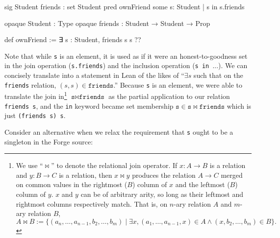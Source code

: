 \vspace{0.5em}
\noindent\begin{minipage}{0.5\textwidth}
\begin{forge*}
sig Student {
  friends : set Student
}
pred ownFriend {
  some s: Student |
    s in s.friends
}
\end{forge*}
\end{minipage}%
\begin{minipage}{0.5\textwidth}
\begin{lean*}
opaque Student : Type
opaque friends : Student → Student → Prop

def ownFriend := 
  ∃ s : Student, 
    friends s s
?\phantom{}?
\end{lean*}
\end{minipage}
\vspace{0.5em}\newline
Note that while \texttt{s} is an element, it is used as if it were an honest-to-goodness set in the join operation (\texttt{s.friends}) and the inclusion operation (\texttt{s in }...). We can concisely translate into a statement in Lean of the likes of ``$\exists s$ such that on the \texttt{friends} relation, $(s,s)\in \texttt{friends}$.'' Because \texttt{s} is an element, we were able to translate the join in\footnote{We use ``$\bowtie$'' to denote the relational join operator. If $x: A \to B$ is a relation and $y: B \to C$ is a relation, then $x\bowtie y$ produces the relation $A\to C$ merged on common values in the rightmost ($B$) column of $x$ and the leftmost ($B$) column of $y$. $x$ and $y$ can be of arbitrary arity, so long as their leftmost and rightmost columns respectively match. That is, on $n$-ary relation $A$ and $m$-ary relation $B$, 
\[A \bowtie B := \{(a_n, \dots, a_{n-1}, b_2, \dots, b_m) \mid \exists x, (a_1, \dots, a_{n-1}, x)\in A \land (x, b_2, \dots, b_m)\in B\}.\]
} $\texttt{s} \bowtie \texttt{friends}$ as the partial application to our relation \texttt{friends s}, and the \texttt{in} keyword became set membership $\texttt{s}\in \texttt{s} \bowtie \texttt{friends}$ which is just \texttt{(friends s) s}. 

Consider an alternative when we relax the requirement that \texttt{s} ought to be a singleton in the Forge source: 

